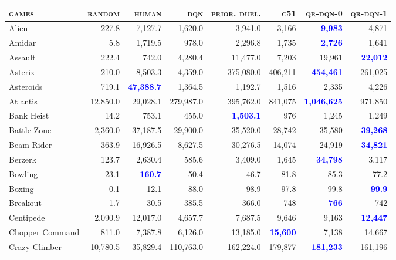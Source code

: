 \documentclass[letterpaper]{article}
\begin{document}
\begin{figure*}
\small
\centering
\begin{tabular}{ l | r|r|r|r|r|r| r }
  \textbf{\textsc{games}}  &  \textbf{\textsc{random}}  &  \textbf{\textsc{human}}  &  \textbf{\textsc{dqn}}  &   \textbf{\textsc{prior.}} \textbf{\textsc{duel.}}  &  \textbf{\textsc{c51}} & \textbf{\textsc{qr-dqn-0}} & \textbf{\textsc{qr-dqn-1}}\\
\hline
Alien & 227.8 & 7,127.7 & 1,620.0 & 3,941.0 & 3,166 & \textbf{\textcolor{blue}{9,983}} & 4,871 \\
Amidar & 5.8 & 1,719.5 & 978.0 & 2,296.8 & 1,735 & \textbf{\textcolor{blue}{2,726}} & 1,641 \\
Assault & 222.4 & 742.0 & 4,280.4 & 11,477.0 & 7,203 & 19,961 & \textbf{\textcolor{blue}{22,012}} \\
Asterix & 210.0 & 8,503.3 & 4,359.0 & 375,080.0 & 406,211 & \textbf{\textcolor{blue}{454,461}} & 261,025 \\
Asteroids & 719.1 & \textbf{\textcolor{blue}{47,388.7}} & 1,364.5 & 1,192.7 & 1,516 & 2,335 & 4,226 \\
Atlantis & 12,850.0 & 29,028.1 & 279,987.0 & 395,762.0 & 841,075 & \textbf{\textcolor{blue}{1,046,625}} & 971,850 \\
Bank Heist & 14.2 & 753.1 & 455.0 & \textbf{\textcolor{blue}{1,503.1}} & 976 & 1,245 & 1,249 \\
Battle Zone & 2,360.0 & 37,187.5 & 29,900.0 & 35,520.0 & 28,742 & 35,580 & \textbf{\textcolor{blue}{39,268}} \\
Beam Rider & 363.9 & 16,926.5 & 8,627.5 & 30,276.5 & 14,074 & 24,919 & \textbf{\textcolor{blue}{34,821}} \\
Berzerk & 123.7 & 2,630.4 & 585.6 & 3,409.0 & 1,645 & \textbf{\textcolor{blue}{34,798}} & 3,117 \\
Bowling & 23.1 & \textbf{\textcolor{blue}{160.7}} & 50.4 & 46.7 & 81.8 & 85.3 & 77.2 \\
Boxing & 0.1 & 12.1 & 88.0 & 98.9 & 97.8 & 99.8 & \textbf{\textcolor{blue}{99.9}} \\
Breakout & 1.7 & 30.5 & 385.5 & 366.0 & 748 & \textbf{\textcolor{blue}{766}} & 742 \\
Centipede & 2,090.9 & 12,017.0 & 4,657.7 & 7,687.5 & 9,646 & 9,163 & \textbf{\textcolor{blue}{12,447}} \\
Chopper Command & 811.0 & 7,387.8 & 6,126.0 & 13,185.0 & \textbf{\textcolor{blue}{15,600}} & 7,138 & 14,667 \\
Crazy Climber & 10,780.5 & 35,829.4 & 110,763.0 & 162,224.0 & 179,877 & \textbf{\textcolor{blue}{181,233}} & 161,196 \\

\end{tabular}
\end{figure*}
\end{document}
